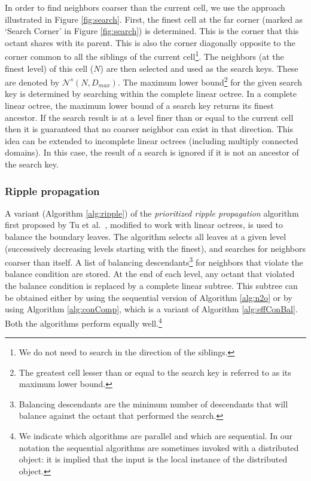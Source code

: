 In order to find neighbors coarser than the current cell, we use the
approach illustrated in Figure \ref{fig:search}. First, the finest
cell at the far corner (marked as `Search Corner' in Figure
\ref{fig:search}) is determined. This is the corner that this octant
shares with its parent. This is also the corner diagonally opposite to
the corner common to all the siblings of the current cell\footnote{We
do not need to search in the direction of the siblings.}. The
neighbors (at the finest level) of this cell ($N$) are then selected
and used as the search keys. These are denoted by
$\mathcal{N}^s\left(N,D_{max}\right)$. The maximum lower
bound\footnote{The greatest cell lesser than or equal to the search
key is referred to as its maximum lower bound.} for the given search
key is determined by searching within the complete linear octree. In a
complete linear octree, the maximum lower bound of a search key
returns its finest ancestor. If the search result is at a level finer
than or equal to the current cell then it is guaranteed that no
coarser neighbor can exist in that direction. This idea can be
extended to incomplete linear octrees (including multiply connected
domains). In this case, the result of a search is ignored if it is not
an ancestor of the search key.

\subsubsection{Ripple propagation}
\label{sec:ripple}
A variant (Algorithm \ref{alg:ripple}) of the {\em prioritized ripple
propagation} algorithm first proposed by Tu et al.\ \cite{tu04a},
modified to work with linear octrees, is used to balance the boundary
leaves. The algorithm selects all leaves at a given level
(successively decreasing levels starting with the finest), and
searches for neighbors coarser than itself. A list of balancing
descendants\footnote{Balancing descendants are the minimum number of
descendants that will balance against the octant that performed the
search.} for neighbors that violate the balance condition are
stored. At the end of each level, any octant that violated the balance
condition is replaced by a complete linear subtree. This subtree can
be obtained either by using the sequential version of Algorithm
\ref{alg:n2o} or by using Algorithm \ref{alg:conComp}, which is a
variant of Algorithm \ref{alg:effConBal}. Both the algorithms perform
equally well.\footnote{We indicate which algorithms are parallel and
which are sequential. In our notation the sequential algorithms are
sometimes invoked with a distributed object: it is implied that the
input is the local instance of the distributed object.}

